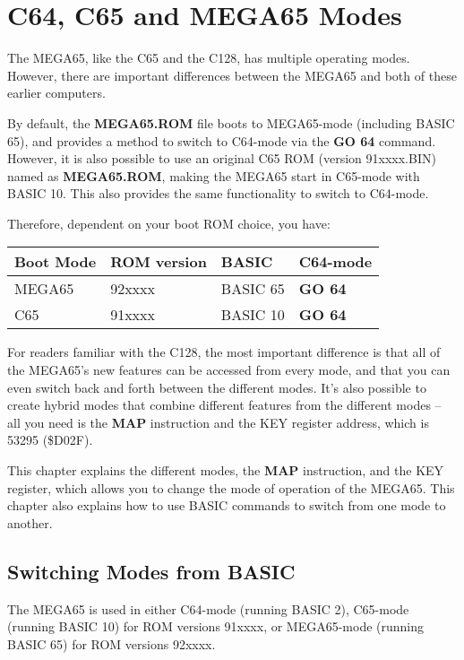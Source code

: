\chapter {C64, C65 and MEGA65 Modes}
\label{cha:modes}

The MEGA65, like the C65 and the C128, has multiple operating modes.
However, there are important differences between the MEGA65 and both
of these earlier computers.

By default, the {\bf MEGA65.ROM} file boots to MEGA65-mode
(including BASIC 65), and
provides a method to switch to C64-mode via the {\bf GO 64} command.
However, it is also possible to use an original C65 ROM (version 91xxxx.BIN)
named as {\bf MEGA65.ROM}, making the MEGA65 start in C65-mode
with BASIC 10. This also provides the same functionality to switch to C64-mode.

Therefore, dependent on your boot ROM choice, you have:

\begin{center}
\begin{tabular}{|l|l|l|l|}
 \hline
  {\textbf{Boot Mode}} & {\textbf{ROM version}} & {\textbf{BASIC}} & {\textbf{C64-mode}} \\
 \hline
   MEGA65    & 92xxxx      & BASIC 65 & {\bf GO 64} \\
   C65       & 91xxxx      & BASIC 10 & {\bf GO 64} \\
 \hline
\end{tabular}
\end{center}
For readers familiar with the C128,
the most important difference is that all of the MEGA65's new features
can be accessed from every mode, and that you can even switch back and forth
between the different modes. It's also possible to create hybrid modes that combine different
features from the different modes -- all you need is the {\bf MAP} instruction and the KEY register address,
which is 53295 (\$D02F).

This chapter explains the different modes, the {\bf MAP} instruction, and
the KEY register, which allows you to change the mode of operation of the MEGA65.
This chapter also explains how to use BASIC commands to switch from one mode to another.

\section{Switching Modes from BASIC}

The MEGA65 is used in either C64-mode (running BASIC 2), C65-mode (running BASIC 10) for ROM versions 91xxxx,
or MEGA65-mode (running BASIC 65) for ROM versions 92xxxx.

